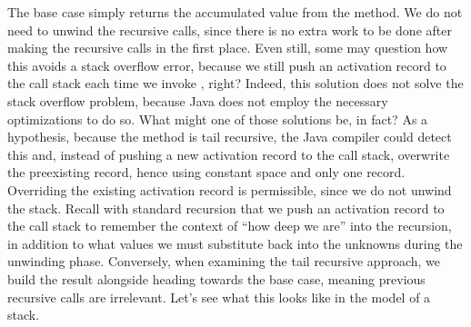 The base case simply returns the accumulated value from the method. 
We do not need to unwind the recursive calls, since there is no extra work to be done after making the recursive calls in the first place. 
Even still, some may question how this avoids a stack overflow error, because we still push an activation record to the call stack each time we invoke , right? 
Indeed, this solution does not solve the stack overflow problem, because Java does not employ the necessary optimizations to do so. 
What might one of those solutions be, in fact? As a hypothesis, because the method is tail recursive, the Java compiler could detect this and, instead of pushing a new activation record to the call stack, overwrite the preexisting record, hence using constant space and only one record. 
Overriding the existing activation record is permissible, since we do not unwind the stack.
Recall with standard recursion that we push an activation record to the call stack to remember the context of ``how deep we are'' into the recursion, in addition to what values we must substitute back into the unknowns during the unwinding phase. 
Conversely, when examining the tail recursive approach, we build the result alongside heading towards the base case, meaning previous recursive calls are irrelevant. 
Let's see what this looks like in the model of a stack.


